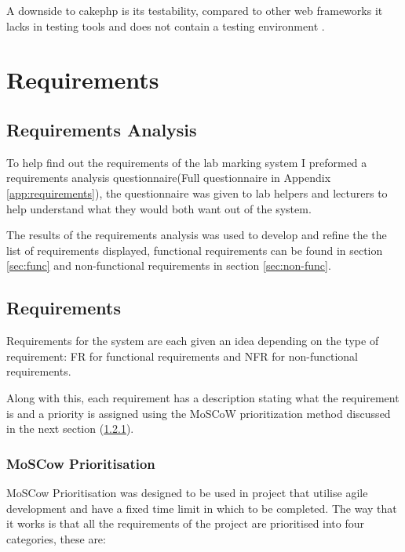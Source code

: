 \documentclass[12pt]{article}  %
\begin{document}
A downside to cakephp is its testability, compared to other web frameworks it lacks in testing tools and does not contain a testing environment \cite{plekhanova_evaluating_2009}.


\newpage
\section{Requirements}
\label{section:require}
 


\subsection{Requirements Analysis}
To help find out the requirements of the lab marking system I preformed a requirements analysis questionnaire(Full questionnaire in Appendix \ref{app:requirements}), the questionnaire was given to lab helpers and lecturers to help understand what they would both want out of the system. 

The results of the requirements analysis was used to develop and refine the the list of requirements displayed, functional requirements can be found in section \ref{sec:func} and non-functional requirements in section \ref{sec:non-func}.



\subsection{Requirements}
\label{sec:requirements}
Requirements for the system are each given an idea depending on the type of requirement: FR for functional requirements and NFR for non-functional requirements.

Along with this, each requirement has a description stating what the requirement is and a  priority is assigned using the MoSCoW prioritization method discussed in the next section (\ref{sec:moscow}).


\subsubsection{MoSCow Prioritisation}
\label{sec:moscow}

MoSCow Prioritisation \cite{noauthor_moscow_2015} was designed to be used in project that utilise agile development and have a fixed time limit in which to be completed. The way that it works is that all the requirements of the project are prioritised into four categories, these are:
\end{document}
